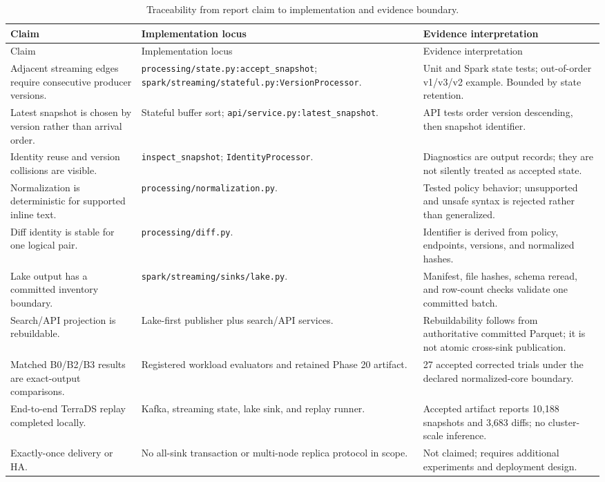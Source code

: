 \documentclass[a4paper,11pt]{article}
\begin{document}
\begin{longtable}{p{}p{}p{}}
\caption{Traceability from report claim to implementation and evidence boundary.}\label{tab:traceability}\\
\toprule
Claim & Implementation locus & Evidence interpretation \\
\midrule
\endfirsthead
\toprule
Claim & Implementation locus & Evidence interpretation \\
\midrule
\endhead
Adjacent streaming edges require consecutive producer versions. & \texttt{processing/state.py:accept\_snapshot}; \texttt{spark/streaming/stateful.py:VersionProcessor}. & Unit and Spark state tests; out-of-order v1/v3/v2 example. Bounded by state retention. \\
Latest snapshot is chosen by version rather than arrival order. & Stateful buffer sort; \texttt{api/service.py:latest\_snapshot}. & API tests order version descending, then snapshot identifier. \\
Identity reuse and version collisions are visible. & \texttt{inspect\_snapshot}; \texttt{IdentityProcessor}. & Diagnostics are output records; they are not silently treated as accepted state. \\
Normalization is deterministic for supported inline text. & \texttt{processing/normalization.py}. & Tested policy behavior; unsupported and unsafe syntax is rejected rather than generalized. \\
Diff identity is stable for one logical pair. & \texttt{processing/diff.py}. & Identifier is derived from policy, endpoints, versions, and normalized hashes. \\
Lake output has a committed inventory boundary. & \texttt{spark/streaming/sinks/lake.py}. & Manifest, file hashes, schema reread, and row-count checks validate one committed batch. \\
Search/API projection is rebuildable. & Lake-first publisher plus search/API services. & Rebuildability follows from authoritative committed Parquet; it is not atomic cross-sink publication. \\
Matched B0/B2/B3 results are exact-output comparisons. & Registered workload evaluators and retained Phase 20 artifact. & 27 accepted corrected trials under the declared normalized-core boundary. \\
End-to-end TerraDS replay completed locally. & Kafka, streaming state, lake sink, and replay runner. & Accepted artifact reports 10,188 snapshots and 3,683 diffs; no cluster-scale inference. \\
Exactly-once delivery or HA. & No all-sink transaction or multi-node replica protocol in scope. & Not claimed; requires additional experiments and deployment design. \\
\bottomrule
\end{longtable}
\end{document}
